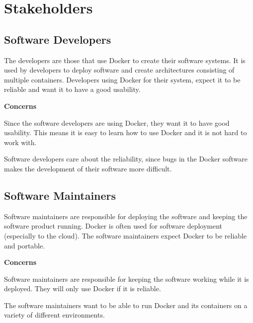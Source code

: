 
\section{Stakeholders}
\label{sec:stakeholders}


\subsection*{Software Developers}
The developers are those that use Docker to create their software systems. It is used by developers to deploy software and create architectures consisting of multiple containers. Developers using Docker for their system, expect it to be reliable and want it to have a good usability. 

\textbf{Concerns}
\begin{description}[labelindent=25pt,style=multiline,leftmargin=4.0cm,font=\normalfont\itshape]

\item[Usability] Since the software developers are using Docker, they want it to have good usability. This means it is easy to learn how to use Docker and it is not hard to work with. 

\item[Reliability] Software developers care about the reliability, since bugs in the Docker software makes the development of their software more difficult. 

\end{description}

\subsection*{Software Maintainers}
Software maintainers are responsible for deploying the software and keeping the software product running. Docker is often used for software deployment (especially to the cloud). %
The software maintainers expect Docker to be reliable and portable.

\textbf{Concerns}
\begin{description}[labelindent=25pt,style=multiline,leftmargin=4.0cm,font=\normalfont\itshape]

\item[Reliability] Software maintainers are responsible for keeping the software working while it is deployed. They will only use Docker if it is reliable. 

\item[Portability] The software maintainers want to be able to run Docker and its containers on a variety of different environments.

\end{description}




